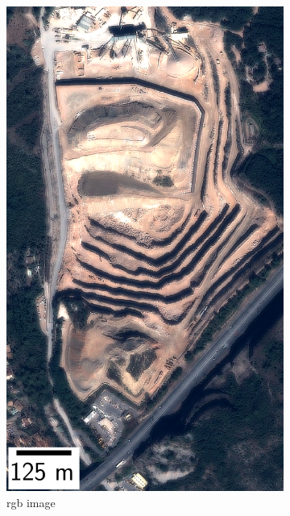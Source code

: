 \begin{figure}
\begin{subfigure}[t]{0.33\linewidth}
        \includegraphics[width=\linewidth]{Images/Chap_6/Carriere_RGB_Monaco.png}
        \caption{\acrshort{rgb} image}
        \label{fig:Carriere_RGB}
    \end{subfigure}\hfill
    \begin{subfigure}[t]{0.33\linewidth}
        \flushright

\end{subfigure}
\end{figure}
